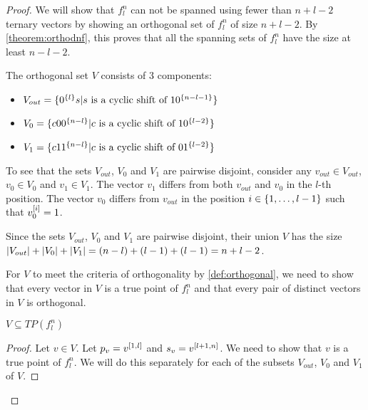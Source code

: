 \begin{proof}
We will show that $f_l^n$ can not be spanned
using fewer than $n+l-2$ ternary vectors
by showing an orthogonal set of $f_l^n$ of size $n+l-2$.
By \cref{theorem:orthodnf},
this proves that all the spanning sets of $f_l^n$
have the size at least $n-l-2$.

The orthogonal set $V$ consists of 3 components:
\begin{itemize}
\item
$V_{out} = \{0^{\{l\}} s
| s \text{ is a cyclic shift of } 1 0^{\{n-l-1\}}\}$
\item
$V_0 = \{c 0 0^{\{n-l\}}
| c \text{ is a cyclic shift of } 1 0^{\{l-2\}}\}$
\item
$V_1 = \{c 1 1^{\{n-l\}}
| c \text{ is a cyclic shift of } 0 1^{\{l-2\}}\}$
\end{itemize}

To see that the sets $V_{out}$, $V_0$ and $V_1$
are pairwise disjoint,
consider any $v_{out} \in V_{out}$,
$v_0 \in V_0$ and $v_1 \in V_1$.
The vector $v_1$ differs from both $v_{out}$ and $v_0$
in the $l$-th position.
The vector $v_0$ differs from $v_{out}$
in the position $i \in \{1, \ldots, l-1\}$
such that $v_0^{[i]} = 1$.

Since the sets $V_{out}$, $V_0$ and $V_1$
are pairwise disjoint,
their union $V$
has the size
$\lvert V_{out}\rvert + \lvert V_0\rvert + \lvert V_1\rvert
= (n-l) + (l-1) + (l-1) = n+l-2$.

For $V$ to meet the criteria of orthogonality
by \cref{def:orthogonal},
we need to show that every vector in $V$
is a true point of $f_l^n$
and that every pair of distinct vectors in $V$
is orthogonal.

\begin{claim}
$V \subseteq TP(f_l^n)$
\end{claim}

\begin{proof}

\hfill
{}
Let $v \in V$.
Let $p_v = v^{[1, l]}$
and $s_v = v^{[l+1, n]}$.
We need to show that $v$ is a true point of $f_l^n$.
We will do this separately for each of the subsets
$V_{out}$, $V_0$ and $V_1$ of $V$.


\end{proof}
\end{proof}
